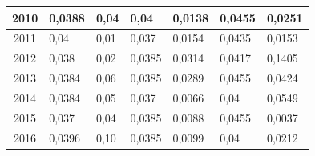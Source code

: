 \begin{table}[H]
\begin{tabular}{|c|l|l|l|l|l|l|}
		2010            & 0,0388                                                 & 0,04                                                    & 0,04                                                       & 0,0138                                                    & 0,0455                                                      & 0,0251                                                      \\ \hline
		2011            & 0,04                                                   & 0,01                                                    & 0,037                                                      & 0,0154                                                    & 0,0435                                                      & 0,0153                                                      \\ \hline
		2012            & 0,038                                                  & 0,02                                                    & 0,0385                                                     & 0,0314                                                    & 0,0417                                                      & 0,1405                                                      \\ \hline
		2013            & 0,0384                                                 & 0,06                                                    & 0,0385                                                     & 0,0289                                                    & 0,0455                                                      & 0,0424                                                      \\ \hline
		2014            & 0,0384                                                 & 0,05                                                    & 0,037                                                      & 0,0066                                                    & 0,04                                                        & 0,0549                                                      \\ \hline
		2015            & 0,037                                                  & 0,04                                                    & 0,0385                                                     & 0,0088                                                    & 0,0455                                                      & 0,0037                                                      \\ \hline
		2016            & 0,0396                                                 & 0,10                                                     & 0,0385                                                     & 0,0099                                                    & 0,04                                                        & 0,0212                                                      \\ \hline

\end{tabular}
\end{table}
